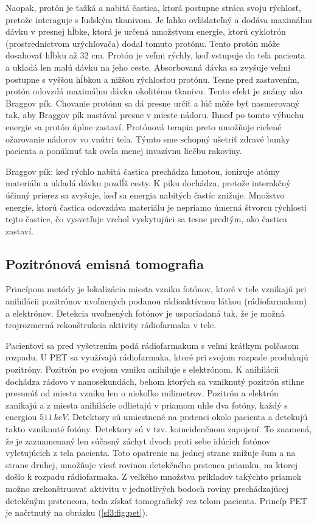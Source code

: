 \documentclass[../../main.tex]{subfiles}
\begin{document}
Naopak, protón je ťažká a nabitá častica, ktorá postupne stráca svoju rýchlosť, pretože interaguje s ľudským tkanivom. Je ľahko ovládateľný a dodáva maximálnu dávku v presnej hĺbke, ktorá je určená množstvom energie, ktorú cyklotrón (prostredníctvom urýchľovača) dodal tomuto protónu. Tento protón môže dosahovať hĺbku až 32 cm. Protón je veľmi rýchly, keď vstupuje do tela pacienta a ukladá len malú dávku na jeho ceste. Absorbovaná dávka sa zvyšuje veľmi postupne s vyššou hĺbkou a nižšou rýchlosťou protónu. Tesne pred zastavením, protón odovzdá maximálnu dávku okolitému tkanivu. Tento efekt je známy ako Braggov pík. Chovanie protónu sa dá presne určiť a lúč môže byť nasmerovaný tak, aby Braggov pík nastával presne v mieste nádoru. Ihneď po tomto výbuchu energie sa protón úplne zastaví. Protónová terapia preto umožňuje cielené ožarovanie nádorov vo vnútri tela. Týmto sme schopný ušetriť zdravé bunky pacienta a ponúknuť tak oveľa menej invazívnu liečbu rakoviny.

Braggov pík: keď rýchlo nabitá častica prechádza hmotou, ionizuje atómy materiálu a ukladá dávku pozdĺž cesty. K piku dochádza, pretože interakčný účinný prierez sa zvyšuje, keď sa energia nabitých častíc znižuje. Množstvo energie, ktorú častica odovzdáva materiálu je nepriamo úmerná štvorcu rýchlosti tejto častice, čo vysvetľuje vrchol vyskytujúci sa tesne predtým, ako častica zastaví.

\subsection{Pozitrónová emisná tomografia}
Princípom metódy je lokalizácia miesta vzniku fotónov, ktoré v tele vznikajú pri anihilácii pozitrónov uvoľnených podanou rádioaktívnou látkou (rádiofarmakom) a elektrónov. Detekcia uvoľnených fotónov je usporiadaná tak, že je možná trojrozmerná rekonštrukcia aktivity rádiofarmaka v tele. 

Pacientovi sa pred vyšetrením podá rádiofarmakum s veľmi krátkym polčasom rozpadu. U PET sa využívajú rádiofarmaka, ktoré pri svojom rozpade produkujú pozitróny. Pozitrón po svojom vzniku anihiluje s elektrónom. K anihilácii dochádza rádovo v nanosekundách, behom ktorých sa vzniknutý pozitrón stihne presunúť od miesta vzniku len o niekoľko milimetrov. Pozitrón a elektrón zanikajú a z miesta anihilácie odlietajú v priamom uhle dva fotóny, každý s energiou $511\,keV$. Detektory sú umiestnené na prstenci okolo pacienta a detekujú takto vzniknuté fotóny. Detektory sú v tzv. koincidenčnom zapojení. To znamená, že  je zaznamenaný len súčasný záchyt dvoch proti sebe idúcich fotónov vyletujúcich z tela pacienta. Toto opatrenie na jednej strane znižuje šum a na strane druhej, umožňuje viesť rovinou detekčného prstenca priamku, na ktorej došlo k rozpadu rádiofarmaka. Z veľkého množstva príkladov takýchto priamok možno zrekonštruovať aktivitu v jednotlivých bodoch roviny prechádzajúcej detekčným prstencom, teda získať tomografický rez telom pacienta. Princíp PET je načrtnutý na obrázku (\ref{sf3:fig:pet}).
\end{document}
